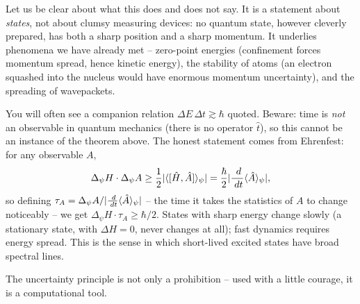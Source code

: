 \documentclass[a4paper]{scrartcl}
\begin{document}
Let us be clear about what this does and does not say. It is a statement about \emph{states}, not about clumsy measuring devices: no quantum state, however cleverly prepared, has both a sharp position and a sharp momentum. It underlies phenomena we have already met -- zero-point energies (confinement forces momentum spread, hence kinetic energy), the stability of atoms (an electron squashed into the nucleus would have enormous momentum uncertainty), and the spreading of wavepackets.

\begin{remark}
    You will often see a companion relation $\Delta E \, \Delta t \gtrsim \hbar$ quoted. Beware: time is \emph{not} an observable in quantum mechanics (there is no operator $\hat{t}$), so this cannot be an instance of the theorem above. The honest statement comes from Ehrenfest: for any observable $A$,
    $$
    \Delta_\psi H \cdot \Delta_\psi A \geq \frac{1}{2}\lvert\langle [\hat H, \hat A] \rangle_\psi\rvert = \frac{\hbar}{2} \lvert\frac{\; d}{\; d t} \langle \hat{A} \rangle_\psi\rvert,
    $$
    so defining $\tau_A = \Delta_\psi A / \lvert\frac{\; d}{\; d t}\langle \hat A \rangle_\psi\rvert$ -- the time it takes the statistics of $A$ to change noticeably -- we get $\Delta_\psi H \cdot \tau_A \geq \hbar/2$. States with sharp energy change slowly (a stationary state, with $\Delta H = 0$, never changes at all); fast dynamics requires energy spread. This is the sense in which short-lived excited states have broad spectral lines.
\end{remark}

The uncertainty principle is not only a prohibition -- used with a little courage, it is a computational tool.
\end{document}
